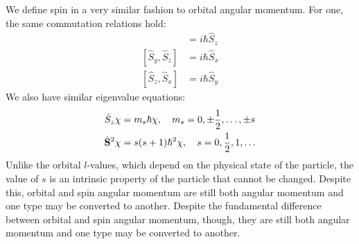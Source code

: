 \documentclass[../p052main.tex]{subfiles}
\begin{document}
We define spin in a very similar fashion to orbital angular momentum.
For one, the same commutation relations hold:
\begin{align*}
    [\hat S_x, \hat S_y] &= i\hbar \hat S_z \\
    [\hat S_y, \hat S_z] &= i\hbar \hat S_x \\
    [\hat S_z, \hat S_x] &= i\hbar \hat S_y
\end{align*}
We also have similar eigenvalue equations:
\begin{align*}
    \hat S_z \chi &= m_s \hbar \chi, \quad m_s = 0, \pm \frac{1}{2}, \ldots, \pm s \\
    \hat{\mathbf{S}}^2 \chi &= s(s+1)\hbar^2 \chi, \quad s = 0, \frac{1}{2}, 1, \ldots
\end{align*}
Unlike the orbital $l$-values, which depend on the physical state of the particle, the value of $s$ is an intrinsic property of the particle that cannot be changed.
Despite this, orbital and spin angular momentum are still both angular momentum and one type may be converted to another.
Despite the fundamental difference between orbital and spin angular momentum, though, they are still both angular momentum and one type may be converted to another.
\end{document}
